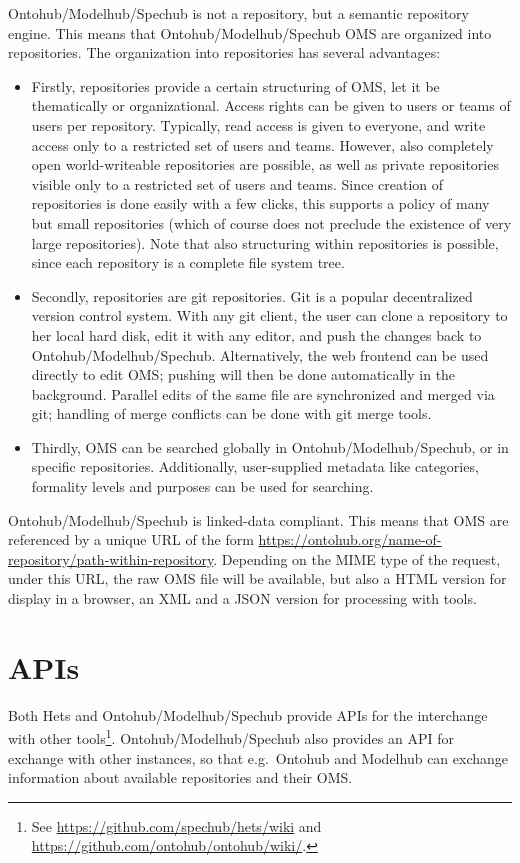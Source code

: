 \documentclass[10pt,fleqn,%
\ifpretendfinal
final%
\else
draft%
\fi,
]{scrreprt}
\newcommand{\sclause}[1]{\section{#1}}
\begin{document}
Ontohub/Modelhub/Spechub is not a repository, but a semantic repository engine. This
means that Ontohub/Modelhub/Spechub OMS are organized into repositories.
The
organization into repositories has several advantages:
\begin{itemize}
\item
 Firstly, repositories provide a certain structuring of OMS,
 let it be thematically or organizational. Access rights can be given
 to users or teams of users per repository. Typically, read access is
 given to everyone, and write access only to a restricted set of users
 and teams. However, also completely open world-writeable repositories
 are possible, as well as private repositories visible only to a
 restricted set of users and teams.  Since creation of repositories is
 done easily with a few clicks, this supports a policy of many but
 small repositories (which of course does not preclude the existence
 of very large repositories). Note that also structuring within
 repositories is possible, since each repository is a complete file
 system tree.
 
\item
 Secondly, repositories are git repositories. Git is a popular
 decentralized version control system. With any git client, the user
 can clone a repository to her local hard disk, edit it
 with any editor, and push the changes back to Ontohub/Modelhub/Spechub. Alternatively,
 the web frontend can be used directly to edit OMS; pushing
 will then be done automatically in the background. Parallel edits of
 the same file are synchronized and merged via git; handling of
 merge conflicts can be done with git merge tools.
\item
Thirdly, OMS can be searched globally in Ontohub/Modelhub/Spechub, or in
specific repositories. Additionally, user-supplied metadata like
categories, formality levels and purposes can be used for searching.
\end{itemize}

Ontohub/Modelhub/Spechub is linked-data compliant. This means that OMS are
referenced by a unique URL of the form
\url{https://ontohub.org/name-of-repository/path-within-repository}. Depending
on the MIME type of the request, under this URL, the raw OMS file
will be available, but also a HTML version for display in a browser, 
an XML and a JSON version for processing with tools.

\sclause{APIs}\label{c:APIs}

Both Hets and Ontohub/Modelhub/Spechub provide APIs for the interchange
with other tools\footnote{See \url{https://github.com/spechub/hets/wiki} and \url{https://github.com/ontohub/ontohub/wiki/}.}. Ontohub/Modelhub/Spechub also provides an API for
exchange with other instances, so that e.g.\ Ontohub and Modelhub
can exchange information about available repositories and their OMS.
\end{document}
